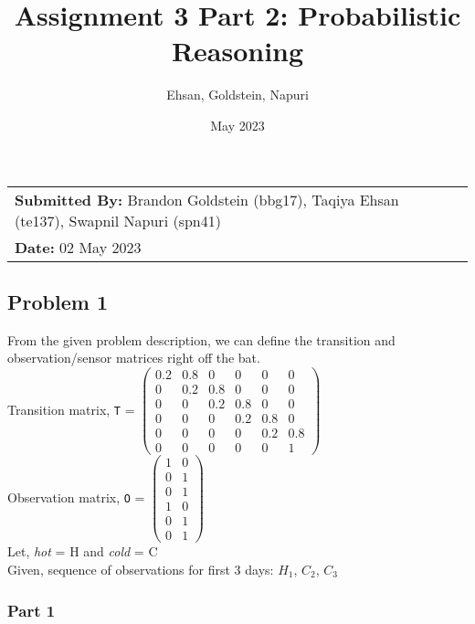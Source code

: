 \documentclass{article}
\title{\textbf{Assignment 3 Part 2:} Probabilistic Reasoning}
\author{Ehsan, Goldstein, Napuri}
\date{May 2023}
\begin{document}
\maketitle

\noindent\begin{tabular}{@{}ll}
    \textbf{Submitted By: }Brandon Goldstein (bbg17), Taqiya Ehsan (te137), Swapnil Napuri (spn41)\\
     \textbf{Date:} 02 May 2023
\end{tabular}

\subsection*{Problem 1}

From the given problem description, we can define the transition and observation/sensor matrices right off the bat. \\

\noindent 
Transition matrix, \texttt{T} = 
$\left(\begin{array}{cccccc} 
        0.2 & 0.8 & 0 & 0 & 0 & 0 \\ 
        0 & 0.2 & 0.8 & 0 & 0 & 0 \\ 
        0 & 0 & 0.2 & 0.8 & 0 & 0 \\ 
        0 & 0 & 0 & 0.2 & 0.8 & 0 \\ 
        0 & 0 & 0 & 0 & 0.2 & 0.8 \\ 
        0 & 0 & 0 & 0 & 0 & 1
    \end{array}\right)$\\

Observation matrix, \texttt{O} = 
$\left(\begin{array}{cc} 
        1 & 0 \\
        0 & 1 \\ 
        0 & 1 \\
        1 & 0 \\
        0 & 1 \\
        0 & 1
    \end{array}\right)$\\

\noindent 
Let, \textit{hot} = H and \textit{cold} = C\\
Given, sequence of observations for first 3 days: {$H_{1}$, $C_{2}$, $C_{3}$}
    
\subsubsection*{Part 1} 
\end{document}
